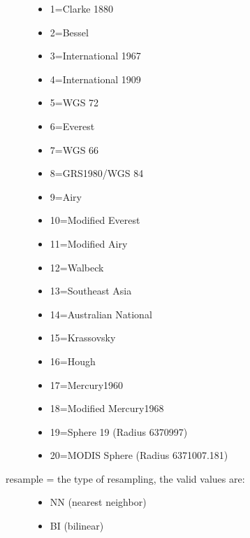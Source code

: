 \documentclass[a4paper,11pt,oneside]{sphinxmanual}
\begin{document}
\begin{fulllineitems}
\begin{fulllineitems}
\begin{description}
\begin{itemize}
\item {} 
1=Clarke 1880

\item {} 
2=Bessel

\item {} 
3=International 1967

\item {} 
4=International 1909

\item {} 
5=WGS 72

\item {} 
6=Everest

\item {} 
7=WGS 66

\item {} 
8=GRS1980/WGS 84

\item {} 
9=Airy

\item {} 
10=Modified Everest

\item {} 
11=Modified Airy

\item {} 
12=Walbeck

\item {} 
13=Southeast Asia

\item {} 
14=Australian National

\item {} 
15=Krassovsky

\item {} 
16=Hough

\item {} 
17=Mercury1960

\item {} 
18=Modified Mercury1968

\item {} 
19=Sphere 19 (Radius 6370997)

\item {} 
20=MODIS Sphere (Radius 6371007.181)

\end{itemize}

\item[{resample = the type of resampling, the valid values are:}] \leavevmode\begin{itemize}
\item {} 
NN (nearest neighbor)

\item {} 
BI (bilinear)


\end{itemize}
\end{description}
\end{fulllineitems}
\end{fulllineitems}
\end{document}
